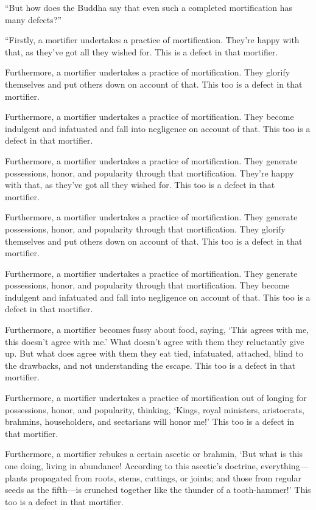 \documentclass[12pt,openany]{book}%
\begin{document}
“But how does the Buddha say that even such a completed mortification has many defects?” 

“Firstly, a mortifier undertakes a practice of mortification. They’re happy with that, as they’ve got all they wished for. This is a defect in that mortifier. 

Furthermore, a mortifier undertakes a practice of mortification. They glorify themselves and put others down on account of that. This too is a defect in that mortifier. 

Furthermore, a mortifier undertakes a practice of mortification. They become indulgent and infatuated and fall into negligence on account of that. This too is a defect in that mortifier. 

Furthermore, a mortifier undertakes a practice of mortification. They generate possessions, honor, and popularity through that mortification. They’re happy with that, as they’ve got all they wished for. This too is a defect in that mortifier. 

Furthermore, a mortifier undertakes a practice of mortification. They generate possessions, honor, and popularity through that mortification. They glorify themselves and put others down on account of that. This too is a defect in that mortifier. 

Furthermore, a mortifier undertakes a practice of mortification. They generate possessions, honor, and popularity through that mortification. They become indulgent and infatuated and fall into negligence on account of that. This too is a defect in that mortifier. 

Furthermore, a mortifier becomes fussy about food, saying, ‘This agrees with me, this doesn’t agree with me.’ What doesn’t agree with them they reluctantly give up. But what does agree with them they eat tied, infatuated, attached, blind to the drawbacks, and not understanding the escape. This too is a defect in that mortifier. 

Furthermore, a mortifier undertakes a practice of mortification out of longing for possessions, honor, and popularity, thinking, ‘Kings, royal ministers, aristocrats, brahmins, householders, and sectarians will honor me!’ This too is a defect in that mortifier. 

Furthermore, a mortifier rebukes a certain ascetic or brahmin, ‘But what is this one doing, living in abundance! According to this ascetic’s doctrine, everything—plants propagated from roots, stems, cuttings, or joints; and those from regular seeds as the fifth—is crunched together like the thunder of a tooth-hammer!’ This too is a defect in that mortifier. 
\end{document}
